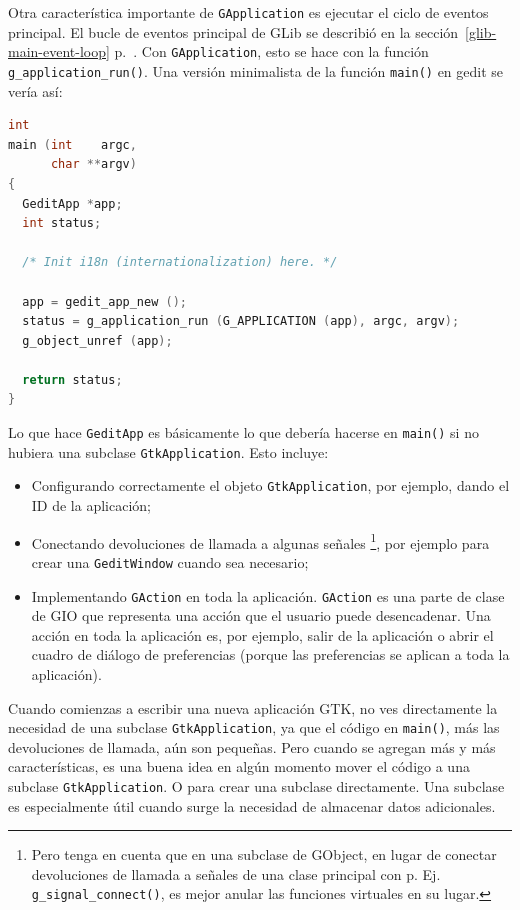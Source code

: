 Otra característica importante de \lstinline{GApplication} es ejecutar el ciclo de eventos principal. El bucle de eventos principal de GLib se describió en la sección~\ref{glib-main-event-loop} p.~\pageref{glib-main-event-loop}. Con \lstinline{GApplication}, esto se hace con la función \lstinline{g_application_run()}. Una versión minimalista de la función \lstinline{main()} en gedit se vería así:

\begin{lstlisting}[language=C]
int
main (int    argc,
      char **argv)
{
  GeditApp *app;
  int status;

  /* Init i18n (internationalization) here. */

  app = gedit_app_new ();
  status = g_application_run (G_APPLICATION (app), argc, argv);
  g_object_unref (app);

  return status;
}
\end{lstlisting}

Lo que hace \lstinline{GeditApp} es básicamente lo que debería hacerse en \lstinline{main()} si no hubiera una subclase \lstinline{GtkApplication}. Esto incluye:
\begin{itemize}
  \item Configurando correctamente el objeto \lstinline{GtkApplication}, por ejemplo, dando el ID de la aplicación;
  \item Conectando devoluciones de llamada a algunas señales \footnote{Pero tenga en cuenta que en una subclase de GObject, en lugar de conectar devoluciones de llamada a señales de una clase principal con p. Ej. \lstinline{g_signal_connect()}, es mejor anular las funciones virtuales en su lugar.}, por ejemplo para crear una \lstinline{GeditWindow} cuando sea necesario;
  \item Implementando \lstinline{GAction} en toda la aplicación. \lstinline{GAction} es una parte de clase de GIO que representa una acción que el usuario puede desencadenar. Una acción en toda la aplicación es, por ejemplo, salir de la aplicación o abrir el cuadro de diálogo de preferencias (porque las preferencias se aplican a toda la aplicación).
\end{itemize}

Cuando comienzas a escribir una nueva aplicación GTK, no ves directamente la necesidad de una subclase \lstinline{GtkApplication}, ya que el código en \lstinline{main()}, más las devoluciones de llamada, aún son pequeñas. Pero cuando se agregan más y más características, es una buena idea en algún momento mover el código a una subclase \lstinline{GtkApplication}. O para crear una subclase directamente. Una subclase es especialmente útil cuando surge la necesidad de almacenar datos adicionales.

